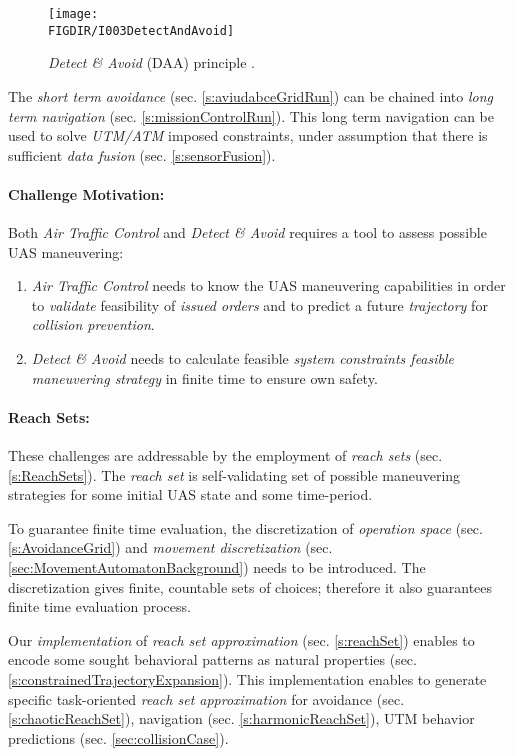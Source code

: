 \begin{figure}[H]
    \centering
    \texttt{[image: \\FIGDIR/I003DetectAndAvoid]}
    \caption{\emph{Detect \& Avoid} (DAA) principle \cite{jenie2014velocity}.}
    \label{fig:detectAdnAvoidIntroduction}
\end{figure}

The \emph{short term avoidance} (sec. \ref{s:aviudabceGridRun}) can be chained into \emph{long term navigation} (sec. \ref{s:missionControlRun}). This long term navigation can be used to solve \emph{UTM/ATM} imposed constraints, under assumption that there is sufficient \emph{data fusion} (sec. \ref{s:sensorFusion}).

\paragraph{Challenge Motivation:} Both \emph{Air Traffic Control} and \emph{Detect \& Avoid} requires a tool to assess possible UAS maneuvering:

\begin{enumerate}
    \item \emph{Air Traffic Control} needs to know the UAS maneuvering capabilities in order to \emph{validate} feasibility of \emph{issued orders} and to predict a future \emph{trajectory} for \emph{collision prevention}.
    
    \item \emph{Detect \& Avoid} needs to calculate feasible \emph{system constraints feasible maneuvering strategy} in finite time to ensure own safety. 
\end{enumerate}

\paragraph{Reach Sets:} These challenges are addressable by the  employment of \emph{reach sets} (sec. \ref{s:ReachSets}). The \emph{reach set} is self-validating set of possible maneuvering strategies for some initial UAS state and some time-period. 

To guarantee finite time evaluation, the discretization of \emph{operation space} (sec. \ref{s:AvoidanceGrid}) and \emph{movement discretization} (sec. \ref{sec:MovementAutomatonBackground}) needs to be introduced. The discretization gives finite, countable sets of choices; therefore it also guarantees finite time evaluation process.

Our \emph{implementation} of \emph{reach set approximation} (sec. \ref{s:reachSet}) enables to encode some sought behavioral patterns as natural properties (sec. \ref{s:constrainedTrajectoryExpansion}). This implementation enables to generate specific task-oriented \emph{reach set approximation} for avoidance (sec. \ref{s:chaoticReachSet}), navigation (sec. \ref{s:harmonicReachSet}), UTM behavior predictions (sec. \ref{sec:collisionCase}). 

